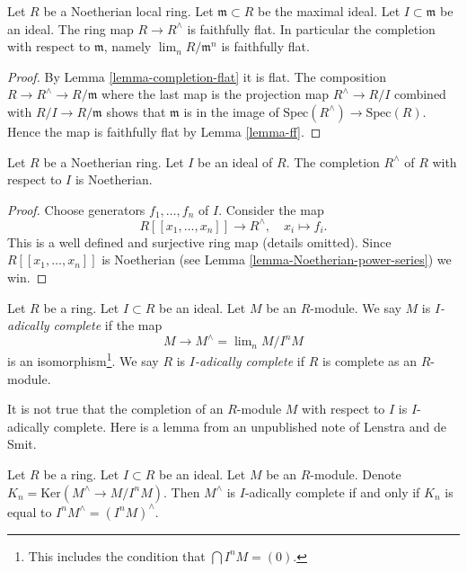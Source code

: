 \begin{lemma}
\label{lemma-completion-faithfully-flat}
Let $R$ be a Noetherian local ring.
Let $\mathfrak m \subset R$ be the maximal ideal.
Let $I \subset \mathfrak m$ be an ideal.
The ring map $R \to R^\wedge$ is faithfully flat.
In particular the completion with respect to $\mathfrak m$,
namely $\lim_n R/\mathfrak m^n$ is faithfully flat.
\end{lemma}

\begin{proof}
By Lemma \ref{lemma-completion-flat} it is flat.
The composition $R \to R^\wedge \to R/\mathfrak m$ where
the last map is the projection map $R^\wedge \to R/I$
combined with $R/I \to R/\mathfrak m$ shows that
$\mathfrak m$ is in the image of $\text{Spec}(R^\wedge)
\to \text{Spec}(R)$. Hence the map is faithfully
flat by Lemma \ref{lemma-ff}.
\end{proof}

\begin{lemma}
\label{lemma-completion-Noetherian}
Let $R$ be a Noetherian ring.
Let $I$ be an ideal of $R$.
The completion $R^\wedge$ of $R$ with respect to $I$ is
Noetherian.
\end{lemma}

\begin{proof}
Choose generators $f_1, \ldots, f_n$ of $I$.
Consider the map
$$
R[[x_1, \ldots, x_n]] \longrightarrow R^\wedge,
\quad
x_i \longmapsto f_i.
$$
This is a well defined and surjective ring map
(details omitted).
Since $R[[x_1, \ldots, x_n]]$ is Noetherian (see
Lemma \ref{lemma-Noetherian-power-series}) we win.
\end{proof}

\begin{definition}
\label{definition-complete}
Let $R$ be a ring. Let $I \subset R$ be an ideal.
Let $M$ be an $R$-module. We say $M$ is {\it $I$-adically complete}
if the map
$$
M \longrightarrow M^\wedge = \lim\nolimits_n M/I^nM
$$
is an isomorphism\footnote{This includes the condition that
$\bigcap I^nM = (0)$.}. We say $R$ is {\it $I$-adically complete}
if $R$ is complete as an $R$-module.
\end{definition}

\noindent
It is not true that the completion of an $R$-module $M$ with respect
to $I$ is $I$-adically complete. Here is a lemma from an unpublished note
of Lenstra and de Smit.

\begin{lemma}
\label{lemma-hathat}
Let $R$ be a ring. Let $I \subset R$ be an ideal. Let $M$ be an $R$-module.
Denote $K_n = \text{Ker}(M^\wedge \to M/I^nM)$. Then $M^\wedge$ is $I$-adically
complete if and only if $K_n$ is equal to
$I^nM^\wedge = (I^nM)^\wedge$.
\end{lemma}

